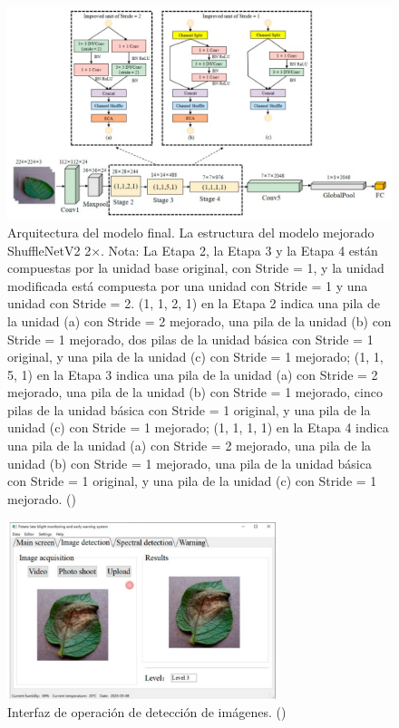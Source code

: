 \begin{figure}[h]						
	\begin{center}
		\includegraphics[width=1\textwidth]{2/figures/ant2.3.jpeg}
		\caption{Arquitectura del modelo final. 
			La estructura del modelo mejorado ShuffleNetV2 2×. Nota: La Etapa 2, la Etapa 3 y la Etapa 4 están compuestas por la unidad base original, con Stride = 1, y la unidad modificada está compuesta por una unidad con Stride = 1 y una unidad con Stride = 2. (1, 1, 2, 1) en la Etapa 2 indica una pila de la unidad (a) con Stride = 2 mejorado, una pila de la unidad (b) con Stride = 1 mejorado, dos pilas de la unidad básica con Stride = 1 original, y una pila de la unidad (c) con Stride = 1 mejorado; (1, 1, 5, 1) en la Etapa 3 indica una pila de la unidad (a) con Stride = 2 mejorado, una pila de la unidad (b) con Stride = 1 mejorado, cinco pilas de la unidad básica con Stride = 1 original, y una pila de la unidad (c) con Stride = 1 mejorado; (1, 1, 1, 1) en la Etapa 4 indica una pila de la unidad (a) con Stride = 2 mejorado, una pila de la unidad (b) con Stride = 1 mejorado, una pila de la unidad básica con Stride = 1 original, y una pila de la unidad (c) con Stride = 1 mejorado. (\cite{antecedente2})}
	\end{center}
\end{figure}
\begin{figure}[H]
	\begin{center}
		\includegraphics[width=0.7\textwidth]{2/figures/ant2.4.jpeg}
		\caption{Interfaz de operación de detección de imágenes. (\cite{antecedente2})}
	\end{center}
\end{figure}

